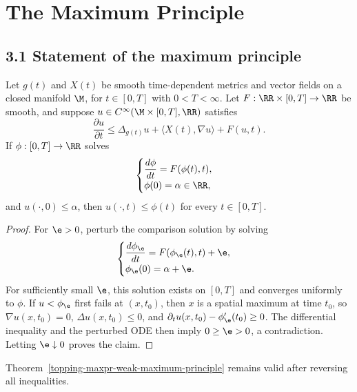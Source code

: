\chapter{The Maximum Principle}

\section*{3.1 \quad Statement of the maximum principle}

\begin{theorem}
\label{topping-maxpr-weak-maximum-principle}


Let $g(t)$ and $X(t)$ be smooth time-dependent metrics and vector fields on a
closed manifold $\M$, for $t\in[0,T]$ with $0<T<\infty$. Let
$F:\RR\times[0,T]\to\RR$ be smooth, and suppose
$u\in C^\infty(\M\times[0,T],\RR)$ satisfies
\[
\frac{\partial u}{\partial t}
\leq \Delta_{g(t)}u+\langle X(t),\nabla u\rangle+F(u,t).
\]
If $\phi:[0,T]\to\RR$ solves
\[
\begin{cases}
\dfrac{d\phi}{dt}=F(\phi(t),t),\\
\phi(0)=\alpha\in\RR,
\end{cases}
\]
and $u(\cdot,0)\leq\alpha$, then $u(\cdot,t)\leq\phi(t)$ for every
$t\in[0,T]$.
\end{theorem}

\begin{proof}
\sketch For $\e>0$, perturb the comparison solution by solving
\[
\begin{cases}
\dfrac{d\phi_\e}{dt}=F(\phi_\e(t),t)+\e,\\
\phi_\e(0)=\alpha+\e.
\end{cases}
\]
For sufficiently small $\e$, this solution exists on $[0,T]$ and converges
uniformly to $\phi$. If $u<\phi_\e$ first fails at $(x,t_0)$, then $x$ is a
spatial maximum at time $t_0$, so $\nabla u(x,t_0)=0$, $\Delta u(x,t_0)\leq0$,
and $\partial_tu(x,t_0)-\phi_\e'(t_0)\geq0$. The differential inequality and
the perturbed ODE then imply $0\geq\e>0$, a contradiction. Letting
$\e\downarrow0$ proves the claim.
\end{proof}

\begin{corollary}
\label{topping-maxpr-weak-minimum-principle}


Theorem~\ref{topping-maxpr-weak-maximum-principle} remains valid after reversing all inequalities.
\end{corollary}


